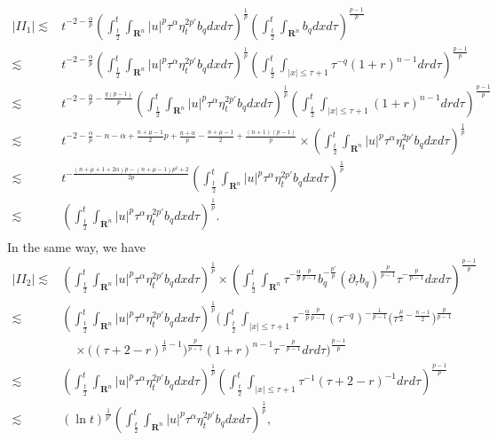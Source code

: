 \documentclass[review]{elsarticle}
\newcommand{\R}{\mathbf{R}}
\begin{document}
\begin{equation}\label{C6}
\begin{aligned}
|II_1|\lesssim&t^{-2-\frac{\alpha}{p}}\left(\int_{\frac t2}^t\int_{\R^n}|u|^p\tau^{\alpha}\eta_t^{2p'}b_q
dxd\tau\right)^{\frac1p}\left(\int_{\frac t2}^{t}\int_{\R^n}b_qdxd\tau\right)^{\frac{p-1}p}\\
\lesssim&t^{-2-\frac{\alpha}{p}}\left(\int_{\frac t2}^t\int_{\R^n}|u|^p\tau^{\alpha}\eta_t^{2p'}b_q
dxd\tau\right)^{\frac1p}\left(\int_{\frac t2}^{t}\int_{|x|\le \tau+1}\tau^{-q}(1+r)^{n-1}drd\tau\right)^{\frac{p-1}p}\\
\lesssim&t^{-2-\frac{\alpha}{p}-\frac{q(p-1)}{p}}
\left(\int_{\frac t2}^t\int_{\R^n}|u|^p\tau^{\alpha}\eta_t^{2p'}b_q
dxd\tau\right)^{\frac1p}\left(\int_{\frac t2}^{t}\int_{|x|\le \tau+1}(1+r)^{n-1}drd\tau\right)^{\frac{p-1}p}\\
\lesssim&t^{-2-\frac{\alpha}{p}-n-\alpha+\frac{n+\mu-1}{2}p+\frac{n+\alpha}{p}
-\frac{n+\mu-1}{2}
+\frac{(n+1)(p-1)}{p}}\times\left(\int_{\frac t2}^t\int_{\R^n}|u|^p\tau^{\alpha}\eta_t^{2p'}b_q
dxd\tau\right)^{\frac1p}\\
\lesssim&t^{-\frac{(n+\mu+1+2\alpha)p-(n+\mu-1)p^2+2}{2p}}\left(\int_{\frac t2}^t\int_{\R^n}|u|^p\tau^{\alpha}\eta_t^{2p'}b_q
dxd\tau\right)^{\frac1p}\\
\lesssim&\left(\int_{\frac t2}^t\int_{\R^n}|u|^p\tau^{\alpha}\eta_t^{2p'}b_q
dxd\tau\right)^{\frac1p}.\\
\end{aligned}
\end{equation}
In the same way, we have
\begin{equation}\label{C7}
\begin{aligned}
|II_2|\lesssim&\left(\int_{\frac t2}^t\int_{\R^n}|u|^p\tau^{\alpha}\eta_t^{2p'}b_q
dxd\tau\right)^{\frac1p}\times\left(\int_{\frac t2}^{t}\int_{\R^n}\tau^{-\frac{\alpha}{p}\frac{p}{p-1}}b_q^{-\frac{p'}{p}}(\partial_\tau b_q)^{\frac{p}{p-1}}\tau^{-\frac{p}{p-1}}dxd\tau\right)^{\frac{p-1}p}\\
\lesssim&\left(\int_{\frac t2}^t\int_{\R^n}|u|^p\tau^{\alpha}\eta_t^{2p'}b_q
dxd\tau\right)^{\frac1p}\Bigg(\int_{\frac t2}^{t}\int_{|x|\le \tau+1}\tau^{-\frac{\alpha}{p}\frac{p}{p-1}}\left(\tau^{-q}\right)^{-\frac 1{p-1}}\big(\tau^{\frac{\mu}{2}-\frac{n-1}{2}}\big)^\frac{p}{p-1}\\
&\quad\times\big((\tau+2-r)^{\frac{1}{p}-1}\big)^\frac{p}{p-1}
(1+r)^{n-1}\tau^{-\frac{p}{p-1}}drd\tau\Bigg)^{\frac{p-1}p}\\
\lesssim&\left(\int_{\frac t2}^t\int_{\R^n}|u|^p\tau^{\alpha}\eta_t^{2p'}b_q
dxd\tau\right)^{\frac1p}\left(\int_{\frac t2}^{t}\int_{|x|\le \tau+1}\tau^{-1}(\tau+2-r)^{-1}drd\tau\right)^{\frac{p-1}p}\\
\lesssim&(\ln t)^{\frac{1}{p'}}\left(\int_{\frac t2}^t\int_{\R^n}|u|^p\tau^{\alpha}\eta_t^{2p'}b_q
dxd\tau\right)^{\frac1p},\\
\end{aligned}
\end{equation}
\end{document}
